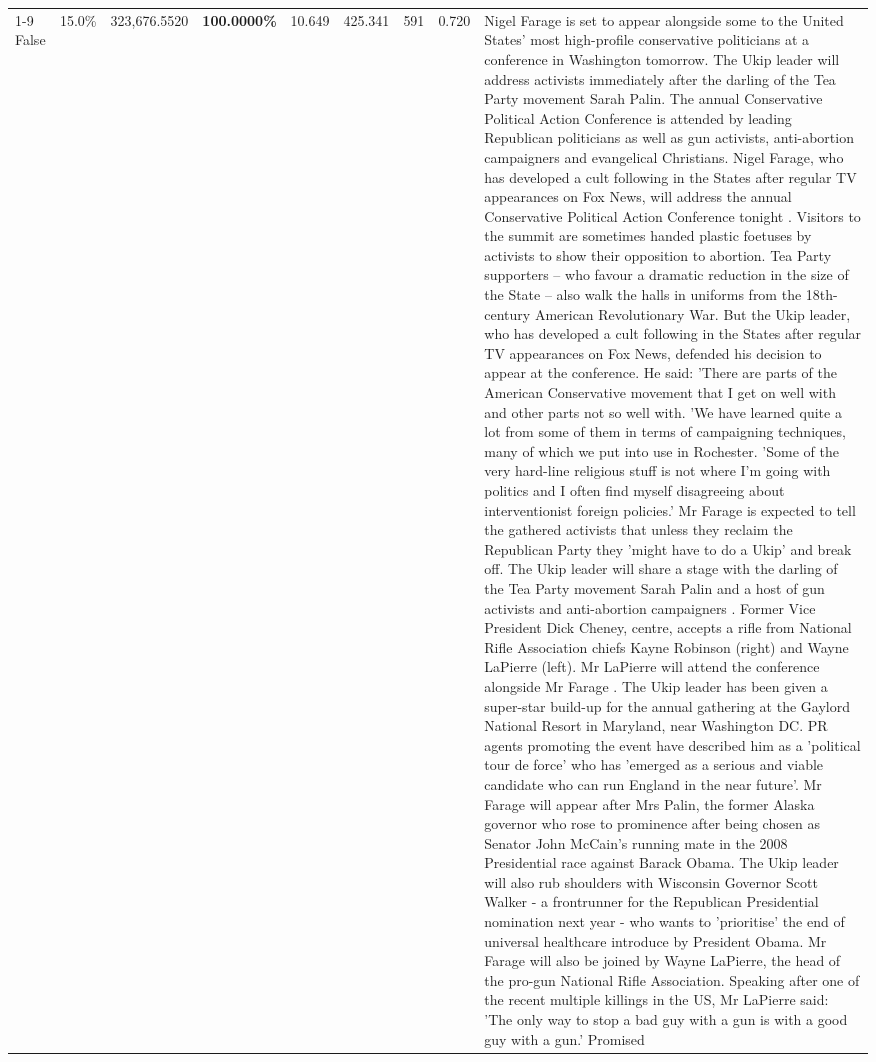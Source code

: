 \begin{table}[H]
\begin{tabular}{lllrlllll}
\cline{1-9}
False & 15.0\% & 323,676.5520 & \bfseries \color{red} 100.0000\% & 10.649 & 425.341 & 591 & 0.720 & Nigel Farage is set to appear alongside some to the United States' most high-profile conservative politicians at a conference in Washington tomorrow. The Ukip leader will address activists immediately after the darling of the Tea Party movement Sarah Palin. The annual Conservative Political Action Conference is attended by leading Republican politicians as well as gun activists, anti-abortion campaigners and evangelical Christians. Nigel Farage, who has developed a cult following in the States after regular TV appearances on Fox News, will address the annual Conservative Political Action Conference tonight . Visitors to the summit are sometimes handed plastic foetuses by activists to show their opposition to abortion. Tea Party supporters – who favour a dramatic reduction in the size of the State – also walk the halls in uniforms from the 18th-century American Revolutionary War. But the Ukip leader, who has developed a cult following in the States after regular TV appearances on Fox News, defended his decision to appear at the conference. He said: 'There are parts of the American Conservative movement that I get on well with and other parts not so well with. 'We have learned quite a lot from some of them in terms of campaigning techniques, many of which we put into use in Rochester. 'Some of the very hard-line religious stuff is not where I'm going with politics and I often find myself disagreeing about interventionist foreign policies.' Mr Farage is expected to tell the gathered activists that unless they reclaim the Republican Party they 'might have to do a Ukip' and break off. The Ukip leader will share a stage with the darling of the Tea Party movement Sarah Palin and a host of gun activists and anti-abortion campaigners . Former Vice President Dick Cheney, centre, accepts a rifle from National Rifle Association chiefs Kayne Robinson (right) and Wayne LaPierre (left). Mr LaPierre will attend the conference alongside Mr Farage . The Ukip leader has been given a super-star build-up for the annual gathering at the Gaylord National Resort in Maryland, near Washington DC. PR agents promoting the event have described him as a 'political tour de force' who has 'emerged as a serious and viable candidate who can run England in the near future'. Mr Farage will appear after Mrs Palin, the former Alaska governor who rose to prominence after being chosen as Senator John McCain's running mate in the 2008 Presidential race against Barack Obama. The Ukip leader will also rub shoulders with Wisconsin Governor Scott Walker - a frontrunner for the Republican Presidential nomination next year - who wants to 'prioritise' the end of universal healthcare introduce by President Obama. Mr Farage will also be joined by Wayne LaPierre, the head of the pro-gun National Rifle Association. Speaking after one of the recent multiple killings in the US, Mr LaPierre said: 'The only way to stop a bad guy with a gun is with a good guy with a gun.' Promised \\

\end{tabular}
\end{table}
